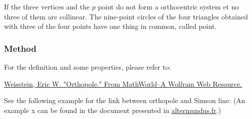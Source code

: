 If the three vertices and the $p$ point do not form a orthocentric system et no three of them are collinear. The nine-point circles of the four triangles obtained with three of the four points have one thing in common, called  point.

\begin{tkzexample}[latex=.5\textwidth]
\begin{center}
\end{center}
\end{tkzexample}

\subsubsection{Method }
\label{ssub:method_triangle_orthopole}

For the definition and some properties, please refer to:
\begin{flushright}
\small
\href{ https://mathworld.wolfram.com/Orthopole.html}{Weisstein, Eric W. "Orthopole." From MathWorld--A Wolfram Web Resource.}
\end{flushright}

See the following example for the link between orthopole and Simson line: (An example x
can be found  in the document  presented in \href{http://altermundus.fr}{altermundus.fr}.)

\begin{tkzexample}[latex=.5\textwidth]
\begin{center}
\end{center}
\end{tkzexample}


